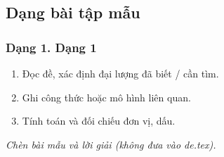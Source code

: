 

\subsection{Dạng bài tập mẫu}
\subsubsection{Dạng 1. Dạng 1}
\begin{phuongphap}
\begin{enumerate}
\item Đọc đề, xác định đại lượng đã biết / cần tìm.
\item Ghi công thức hoặc mô hình liên quan.
\item Tính toán và đối chiếu đơn vị, dấu.
\end{enumerate}
\end{phuongphap}
\begin{vidumau}
\textit{Chèn bài mẫu và lời giải (không đưa vào de.tex).}
\end{vidumau}

